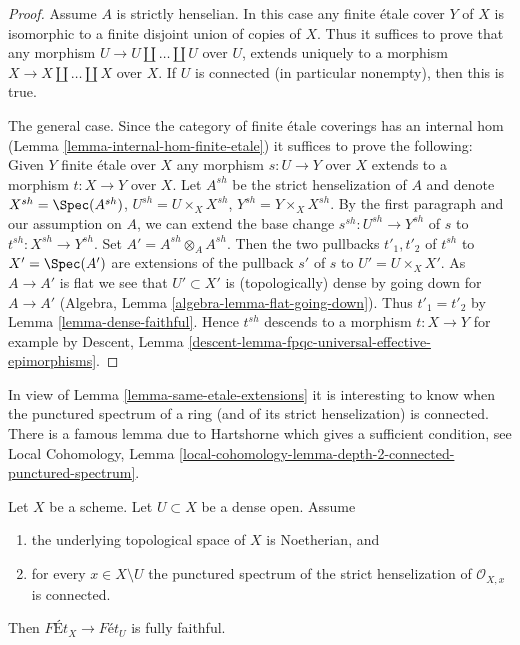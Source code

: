 \begin{proof}
Assume $A$ is strictly henselian. In this case any finite \'etale
cover $Y$ of $X$ is isomorphic to a finite disjoint union of
copies of $X$. Thus it suffices to prove that any morphism
$U \to U \amalg \ldots \amalg U$ over $U$, extends uniquely to a morphism
$X \to X \amalg \ldots \amalg X$ over $X$.
If $U$ is connected (in particular nonempty), then this is true.

\medskip\noindent
The general case. Since the category of finite \'etale coverings has an
internal hom (Lemma \ref{lemma-internal-hom-finite-etale})
it suffices to prove the following: Given $Y$ finite \'etale over $X$
any morphism $s : U \to Y$ over $X$ extends to a morphism $t : X \to Y$
over $X$. Let $A^{sh}$ be the strict henselization of $A$ and denote
$X^{sh} = \Spec(A^{sh})$, $U^{sh} = U \times_X X^{sh}$,
$Y^{sh} = Y \times_X X^{sh}$. By the first paragraph and our assumption
on $A$, we can extend the base change $s^{sh} : U^{sh} \to Y^{sh}$ of $s$ to
$t^{sh} : X^{sh} \to Y^{sh}$. Set $A' = A^{sh} \otimes_A A^{sh}$.
Then the two pullbacks $t'_1, t'_2$ of $t^{sh}$ to $X' = \Spec(A')$
are extensions of the pullback $s'$ of $s$ to $U' = U \times_X X'$.
As $A \to A'$ is flat we see that $U' \subset X'$ is (topologically) dense
by going down for $A \to A'$
(Algebra, Lemma \ref{algebra-lemma-flat-going-down}). Thus
$t'_1 = t'_2$ by Lemma \ref{lemma-dense-faithful}.
Hence $t^{sh}$ descends to a morphism $t : X \to Y$
for example by
Descent, Lemma \ref{descent-lemma-fpqc-universal-effective-epimorphisms}.
\end{proof}

\noindent
In view of Lemma \ref{lemma-same-etale-extensions}
it is interesting to know when the
punctured spectrum of a ring (and of its strict henselization)
is connected. There is a famous lemma due to Hartshorne
which gives a sufficient condition, see
Local Cohomology, Lemma
\ref{local-cohomology-lemma-depth-2-connected-punctured-spectrum}.

\begin{lemma}
\label{lemma-quasi-compact-dense-open-connected-at-infinity-Noetherian}
Let $X$ be a scheme. Let $U \subset X$ be a dense open. Assume
\begin{enumerate}
\item the underlying topological space of $X$ is Noetherian, and
\item for every $x \in X \setminus U$ the punctured spectrum of the
strict henselization of $\mathcal{O}_{X, x}$ is connected.
\end{enumerate}
Then $\textit{F\'Et}_X \to \textit{F\'et}_U$ is fully faithful.
\end{lemma}


